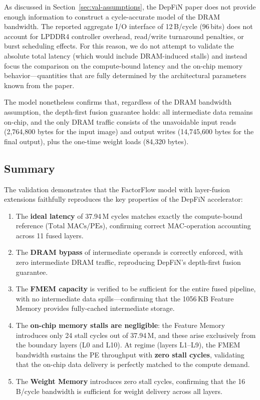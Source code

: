 As discussed in Section~\ref{sec:val-assumptions}, the DepFiN paper
does not provide enough information to construct a cycle-accurate
model of the DRAM bandwidth.
The reported aggregate I/O interface of 12\,B/cycle (96\,bits) does
not account for LPDDR4 controller overhead, read/write turnaround
penalties, or burst scheduling effects.
For this reason, we do not attempt to validate the absolute total
latency (which would include DRAM-induced stalls) and instead focus
the comparison on the compute-bound latency and the on-chip memory
behavior---quantities that are fully determined by the architectural
parameters known from the paper.

The model nonetheless confirms that, regardless of the DRAM bandwidth
assumption, the depth-first fusion guarantee holds: all intermediate
data remains on-chip, and the only DRAM traffic consists of the
unavoidable input reads (2,764,800 bytes for the input image) and
output writes (14,745,600 bytes for the final output), plus the
one-time weight loads (84,320 bytes).


\subsection{Summary}

The validation demonstrates that the FactorFlow model with layer-fusion
extensions faithfully reproduces the key properties of the DepFiN
accelerator:
\begin{enumerate}
  \item The \textbf{ideal latency} of 37.94\,M cycles matches exactly
        the compute-bound reference
        ($\text{Total MACs}/\text{PEs}$), confirming correct
        MAC-operation accounting across 11 fused layers.
  \item The \textbf{DRAM bypass} of intermediate operands is correctly
        enforced, with zero intermediate DRAM traffic, reproducing
        DepFiN's depth-first fusion guarantee.
  \item The \textbf{FMEM capacity} is verified to be sufficient for
        the entire fused pipeline, with no intermediate data
        spills---confirming that the 1056\,KB Feature Memory provides
        fully-cached intermediate storage.
  \item The \textbf{on-chip memory stalls are negligible}: the Feature
        Memory introduces only 24 stall cycles out of 37.94\,M, and
        these arise exclusively from the boundary layers (L0 and L10).
        At regime (layers L1--L9), the FMEM bandwidth sustains the PE
        throughput with \textbf{zero stall cycles}, validating that the
        on-chip data delivery is perfectly matched to the compute
        demand.
  \item The \textbf{Weight Memory} introduces zero stall cycles,
        confirming that the 16\,B/cycle bandwidth is sufficient for
        weight delivery across all layers.
\end{enumerate}

